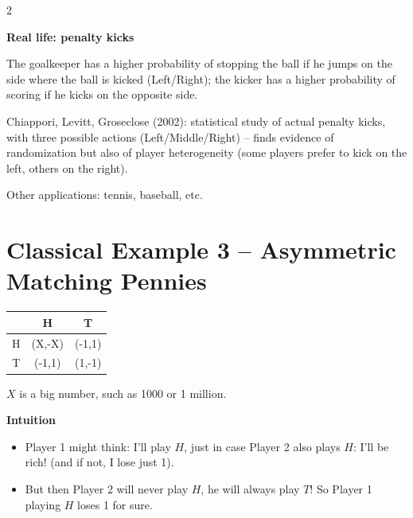 \documentclass[a4paper,9pt]{extarticle}
\begin{document}
\begin{multicols}{2}
\begin{summary}
\begin{itemize}
\end{itemize}

\end{summary}


\begin{example}

\textbf{Real life: penalty kicks}

The goalkeeper has a higher probability of stopping the ball if he jumps on the side where
the ball is kicked (Left/Right); the kicker has a higher probability of scoring if he kicks
on the opposite side.

Chiappori, Levitt, Groseclose (2002): statistical study of actual penalty kicks, with three
possible actions (Left/Middle/Right) -- finds evidence of randomization but also of player
heterogeneity (some players prefer to kick on the left, others on the right).

Other applications: tennis, baseball, etc.

\end{example}



\section{Classical Example 3 -- Asymmetric Matching Pennies}


\begin{center}
\begin{tabular}{c|cc}
 & H & T \\
\hline
H & (X,-X) & (-1,1) \\
T & (-1,1) & (1,-1) \\
\end{tabular}
\end{center}

$X$ is a big number, such as 1000 or 1 million.


\begin{example}

\textbf{Intuition}

\begin{itemize}

\item Player 1 might think: I'll play $H$, just in case Player 2 also plays $H$: I'll be
rich! (and if not, I lose just 1).

\item But then Player 2 will never play $H$, he will always play $T$! So Player 1 playing $H$
loses 1 for sure.


\end{itemize}
\end{example}
\end{multicols}
\end{document}
